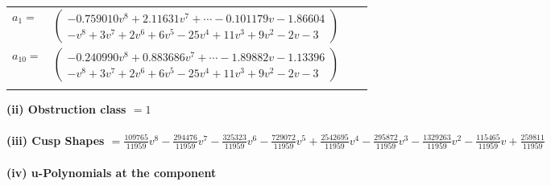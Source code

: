 \documentclass[1p]{elsarticle_modified}
\theoremstyle{definition}
\begin{document}
\begin{tabular}{m{7pt} m{180pt} m{7pt} m{180pt} }
\flushright $a_{1}=$&$\begin{pmatrix}-0.759010 v^{8}+2.11631 v^{7}+\cdots-0.101179 v-1.86604\\- v^8+3 v^7+2 v^6+6 v^5-25 v^4+11 v^3+9 v^2-2 v-3\end{pmatrix}$ \\
\flushright $a_{10}=$&$\begin{pmatrix}-0.240990 v^{8}+0.883686 v^{7}+\cdots-1.89882 v-1.13396\\- v^8+3 v^7+2 v^6+6 v^5-25 v^4+11 v^3+9 v^2-2 v-3\end{pmatrix}$\\&\end{tabular}
\flushleft \textbf{(ii) Obstruction class $= 1$}\\~\\
\flushleft \textbf{(iii) Cusp Shapes $= \frac{109765}{11959} v^8-\frac{294476}{11959} v^7-\frac{325323}{11959} v^6-\frac{729072}{11959} v^5+\frac{2542695}{11959} v^4-\frac{295872}{11959} v^3-\frac{1329263}{11959} v^2-\frac{115465}{11959} v+\frac{259811}{11959}$}\\~\\
\newpage\renewcommand{\arraystretch}{1}
\flushleft \textbf{(iv) u-Polynomials at the component}\newline \\
\end{document}
